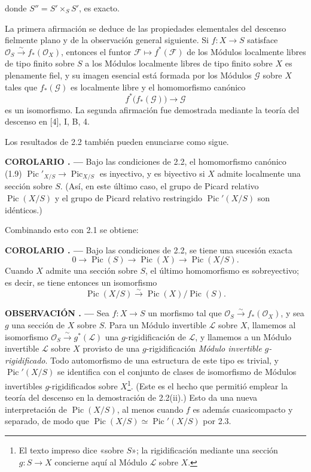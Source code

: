 \documentclass[11pt,twoside,openany]{book}
\numberwithin{equation}{section}
\newcommand{\src}[1]{%
  \phantomsection\hypertarget{src:#1}{}%
  \marginpar{\raggedleft\footnotesize\sffamily #1}%
}
\theoremstyle{plain}
\theoremstyle{definition}
\theoremstyle{remark}
\newcommand{\result}[2]{%
  \par\medskip\noindent\textbf{#1%
  \if\relax\detokenize{#2}\relax\else\space#2\fi. ---}\enspace
}
\newcommand{\FgaUnitKey}{frontmatter}
\renewcommand{\src}[1]{%
  \phantomsection\hypertarget{src:\FgaUnitKey:#1}{}%
  \marginpar{\raggedleft\footnotesize\sffamily #1}%
}
\theoremstyle{plain}
\theoremstyle{definition}
\theoremstyle{remark}
\begin{document}
\src{147}
donde $S''=S'\times_SS'$, es exacto.

La primera afirmación se deduce de las propiedades elementales del descenso
fielmente plano y de la observación general siguiente. Si
$f:X\longrightarrow S$ satisface
$\mathcal O_S\xrightarrow{\sim}f_*(\mathcal O_X)$, entonces el funtor
$\mathcal F\longmapsto f^*(\mathcal F)$ de los Módulos localmente libres de
tipo finito sobre $S$ a los Módulos localmente libres de tipo finito sobre $X$
es plenamente fiel, y su imagen esencial está formada por los Módulos
$\mathcal G$ sobre $X$ tales que $f_*(\mathcal G)$ es localmente libre y el
homomorfismo canónico
\[
f^*\bigl(f_*(\mathcal G)\bigr)\longrightarrow\mathcal G
\]
es un isomorfismo. La segunda afirmación fue demostrada mediante la teoría del
descenso en [4], I, B, 4.

Los resultados de 2.2 también pueden enunciarse como sigue.

\result{COROLARIO}{2.3} Bajo las condiciones de 2.2, el homomorfismo canónico
(1.9) $\operatorname{Pic}'_{X/S}\longrightarrow\operatorname{Pic}_{X/S}$ es
inyectivo, y es biyectivo si $X$ admite localmente una sección sobre $S$.
(Así, en este último caso, el grupo de Picard relativo
$\operatorname{Pic}(X/S)$ y el grupo de Picard relativo restringido
$\operatorname{Pic}'(X/S)$ son idénticos.)

Combinando esto con 2.1 se obtiene:

\result{COROLARIO}{2.4} Bajo las condiciones de 2.2, se tiene una sucesión
exacta
\[
0\longrightarrow\operatorname{Pic}(S)\longrightarrow\operatorname{Pic}(X)
\longrightarrow\operatorname{Pic}(X/S).
\]
Cuando $X$ admite una sección sobre $S$, el último homomorfismo es
sobreyectivo; es decir, se tiene entonces un isomorfismo
\[
\operatorname{Pic}(X/S)\xrightarrow{\sim}
\operatorname{Pic}(X)/\operatorname{Pic}(S).
\]

\result{OBSERVACIÓN}{2.5} Sea $f:X\longrightarrow S$ un morfismo tal que
$\mathcal O_S\xrightarrow{\sim}f_*(\mathcal O_X)$, y sea $g$ una sección de
$X$ sobre $S$. Para un Módulo invertible $\mathcal L$ sobre $X$, llamemos al
isomorfismo $\mathcal O_S\xrightarrow{\sim}g^*(\mathcal L)$ una
$g$-rigidificación de $\mathcal L$, y llamemos a un Módulo invertible
$\mathcal L$ sobre $X$ provisto de una $g$-rigidificación \emph{Módulo
invertible $g$-rigidificado}. Todo automorfismo de una estructura de este
tipo es trivial, y $\operatorname{Pic}'(X/S)$ se identifica con el conjunto de
clases de isomorfismo de Módulos invertibles $g$-rigidificados sobre
$X$\footnote{El texto impreso dice «sobre $S$»; la rigidificación mediante una
sección $g:S\to X$ concierne aquí al Módulo $\mathcal L$ sobre $X$.}. (Este es
el hecho que permitió emplear la teoría del descenso en la demostración de
2.2(ii).) Esto da una nueva interpretación de $\operatorname{Pic}(X/S)$, al
menos cuando $f$ es además cuasicompacto y separado, de modo que
$\operatorname{Pic}(X/S)\simeq\operatorname{Pic}'(X/S)$ por 2.3.
\end{document}
